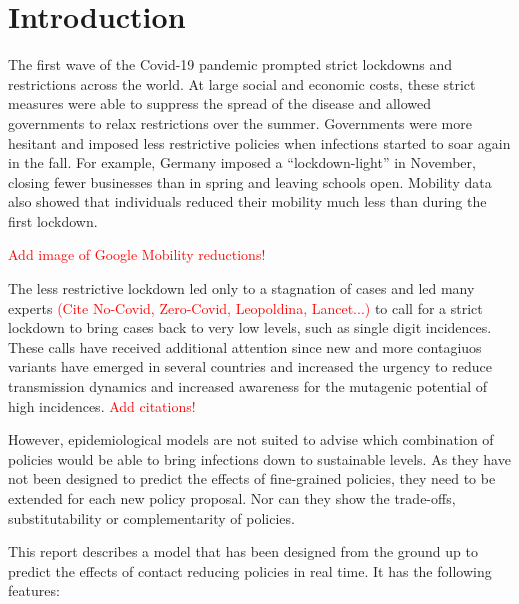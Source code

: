 \section{Introduction}
\label{sec:introduction}

The first wave of the Covid-19 pandemic prompted strict lockdowns and restrictions
across the world.
At large social and economic costs, these strict measures were able to suppress the
spread of the disease and allowed governments to relax restrictions over the summer.
Governments were more hesitant and imposed less restrictive policies when infections
started to soar again in the fall.
For example, Germany imposed a ``lockdown-light'' in November, closing fewer businesses
than in spring and leaving schools open. Mobility data also showed that individuals
reduced their mobility much less than during the first lockdown.

\textcolor{red}{Add image of Google Mobility reductions!}

The less restrictive lockdown led only to a stagnation of cases and led many experts
\textcolor{red}{(Cite No-Covid, Zero-Covid, Leopoldina, Lancet...)} to call for a
strict lockdown to bring cases back to very low levels, such as single digit incidences.
These calls have received additional attention since new and more contagiuos variants
have emerged in several countries and increased the urgency to reduce transmission
dynamics and increased awareness for the mutagenic potential of high incidences.
\textcolor{red}{Add citations!}

However, epidemiological models are not suited to advise which combination of policies
would be able to bring infections down to sustainable levels.
As they have not been designed to predict the effects of fine-grained policies,
they need to be extended for each new policy proposal.
Nor can they show the trade-offs, substitutability or complementarity of policies.

This report describes a model that has been designed from the ground up to predict the
effects of contact reducing policies in real time. It has the following features:

